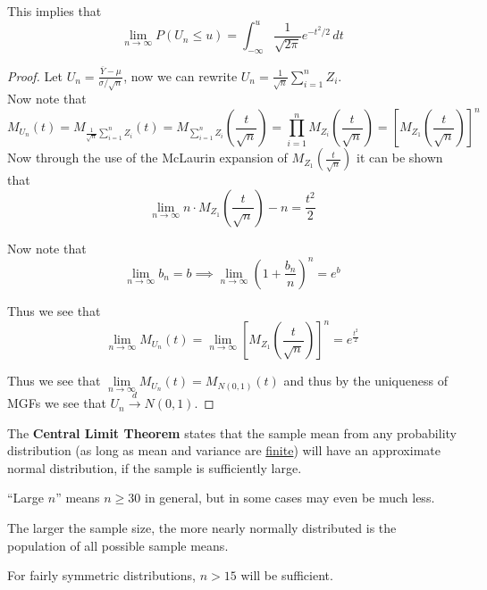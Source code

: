 \documentclass[a4paper,12pt]{article}
\theoremstyle{nonitalic}
\begin{document}
    This implies that
    \[
        \lim_{n \to \infty} P(U_n \leq u) = \int_{-\infty}^{u} \frac{1}{\sqrt{2\pi}} e^{-t^2/2} \, dt
    \]

    \begin{proof}
        Let $U_n = \frac{\overline{Y} - \mu}{\sigma / \sqrt{n}}$, now we can rewrite $U_n = \frac{1}{\sqrt{n}} \sum\limits_{i=1}^{n} Z_i$.\\
        Now note that
        \[
            M_{U_n}(t) = M_{\frac{1}{\sqrt{n}} \sum\limits_{i=1}^{n} Z_i}(t) = M_{\sum\limits_{i=1}^{n} Z_i}\left(\frac{t}{\sqrt n}\right) = \prod_{i=1}^{n} M_{Z_i} \left(\frac{t}{\sqrt n}\right) = \left[M_{Z_1}\left(\frac{t}{\sqrt{n}}\right)\right]^n
        \]
        Now through the use of the McLaurin expansion of \(M_{Z_1}\left(\frac{t}{\sqrt{n}}\right)\) it can be shown that
        \[
            \lim_{n \to \infty} n \cdot M_{Z_1}\left(\frac{t}{\sqrt{n}}\right) - n = \frac{t^2}{2}
        \]

        Now note that
        \[
            \lim_{n \to \infty} b_n = b \implies \lim_{n \to \infty} \left(1 + \frac{b_n}{n}\right)^n = e^b
        \]

        Thus we see that
        \[
            \lim_{n \to \infty} M_{U_n}(t) = \lim_{n \to \infty} \left[M_{Z_1}\left(\frac{t}{\sqrt{n}}\right)\right]^n = e^{\frac{t^2}{2}}
        \]

        Thus we see that $\lim\limits_{n \to \infty} M_{U_n}(t) = M_{N(0,1)}(t)$ and thus by the uniqueness of MGFs we see that $U_n \overset{d}{\to} N(0,1)$.
    \end{proof}

    \bigskip

    The \textbf{Central Limit Theorem} states that the sample mean from any probability distribution (as long as mean and variance are \uline{finite}) will have an approximate normal distribution, if the sample is sufficiently large.

    \bigskip

    ``Large \( n \)'' means \( n \geq 30 \) in general, but in some cases may even be much less.

    \bigskip

    The larger the sample size, the more nearly normally distributed is the population of all possible sample means.

    \bigskip

    For fairly symmetric distributions, \( n > 15 \) will be sufficient.

    \newpage
\end{document}
